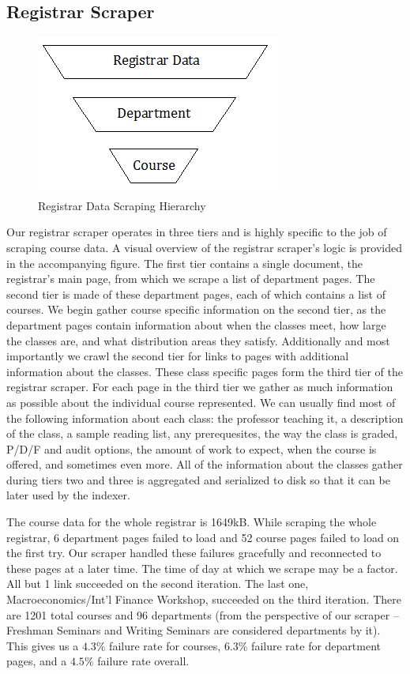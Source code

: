 \documentclass[12pt,letterpaper]{article}
\begin{document}
\subsection{Registrar Scraper}

\begin{figure}
\begin{center}
\includegraphics{RegistrarDiagram.png}
\end{center}
\caption{Registrar Data Scraping Hierarchy}
\end{figure}

Our registrar scraper operates in three tiers and is highly specific to the job of scraping course data. A visual overview of the registrar scraper's logic is provided in the accompanying figure. The first tier contains a single document, the registrar's main page, from which we scrape a list of department pages. The second tier is made of these department pages, each of which contains a list of courses. We begin gather course specific information on the second tier, as the department pages contain information about when the classes meet, how large the classes are, and what distribution areas they satisfy. Additionally and most importantly we crawl the second tier for links to pages with additional information about the classes. These class specific pages form the third tier of the registrar scraper. For each page in the third tier we gather as much information as possible about the individual course represented. We can usually find most of the following information about each class: the professor teaching it, a description of the class, a sample reading list, any prerequesites, the way the class is graded, P/D/F and audit options, the amount of work to expect, when the course is offered, and sometimes even more. All of the information about the classes gather during tiers two and three is aggregated and serialized to disk so that it can be later used by the indexer.

The course data for the whole registrar is 1649kB. While scraping the whole registrar, 6 department pages failed to load and 52 course pages failed to load on the first try. Our scraper handled these failures gracefully and reconnected to these pages at a later time. The time of day at which we scrape may be a factor. All but 1 link succeeded on the second iteration. The last one, Macroeconomics/Int'l Finance Workshop, succeeded on the third iteration. There are 1201 total courses and 96 departments (from the perspective of our scraper -- Freshman Seminars and Writing Seminars are considered departments by it). This gives us a $4.3\%$ failure rate for courses, $6.3\%$ failure rate for department pages, and a $4.5\%$ failure rate overall. 
\end{document}
